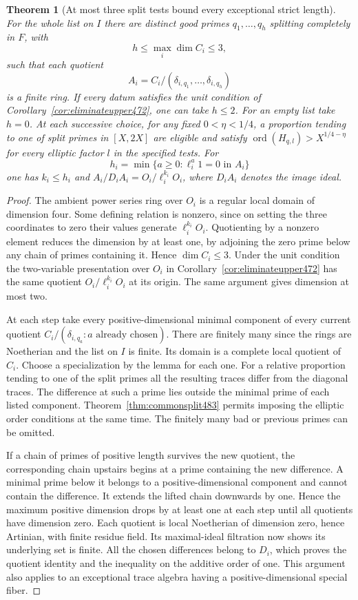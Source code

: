 \documentclass[a4paper,11pt]{article}
\newtheorem{theorem}[proposition]{Theorem}
\theoremstyle{definition}
\theoremstyle{remark}
\numberwithin{equation}{section}
\begin{document}
\begin{theorem}[At most three split tests bound every exceptional strict length]\leavevmode
\label{thm:artiniansplit490}
For the whole list on \(I\) there are distinct good primes
\(q_1,\ldots,q_h\) splitting completely in \(F\), with
\[
       h\le \max_i\dim C_i\le3 ,
\]
such that each quotient
\[
 A_i=C_i/(\delta_{i,q_1},\ldots,\delta_{i,q_h})
\]
is a finite ring. If every datum satisfies the unit condition of
Corollary~\ref{cor:eliminateupper472}, one can take \(h\le2\).
For an empty list take \(h=0\). At each successive choice, for
any fixed \(0<\eta<1/4\), a proportion tending to one of split
primes in \([X,2X]\) are eligible and satisfy
\(\operatorname{ord}(H_{q,l})>X^{1/4-\eta}\) for every elliptic
factor \(l\) in the specified tests. For
\[
 h_i=\min\{a\ge0:\ell_i^a1=0\text{ in }A_i\}
\]
one has \(k_i\le h_i\) and \(A_i/D_iA_i=O_i/\ell_i^{k_i}O_i\),
where \(D_iA_i\) denotes the image ideal.
\end{theorem}
\begin{proof}
The ambient power series ring over \(O_i\) is a regular local
domain of dimension four. Some defining relation is nonzero,
since on setting the three coordinates to zero their values
generate \(\ell_i^{k_i}O_i\). Quotienting by a nonzero element
reduces the dimension by at least one, by adjoining the zero
prime below any chain of primes containing it. Hence
\(\dim C_i\le3\). Under the unit condition the two-variable
presentation over \(O_i\) in Corollary~\ref{cor:eliminateupper472}
has the same quotient \(O_i/\ell_i^{k_i}O_i\) at its origin.
The same argument gives dimension at most two.

At each step take every positive-dimensional minimal component
of every current quotient \(C_i/(\delta_{i,q_a}:a\text{ already chosen})\).
There are finitely many since the rings are Noetherian and the
list on \(I\) is finite. Its domain is a complete local quotient
of \(C_i\). Choose a specialization by the lemma for each one.
For a relative proportion tending to one of the split primes
all the resulting traces differ from the diagonal traces.
The difference at such a prime lies outside the minimal prime
of each listed component. Theorem~\ref{thm:commonsplit483}
permits imposing the elliptic order conditions at the same time.
The finitely many bad or previous primes can be omitted.

If a chain of primes of positive length survives the new quotient,
the corresponding chain upstairs begins at a prime containing the
new difference. A minimal prime below it belongs to a
positive-dimensional component and cannot contain the difference.
It extends the lifted chain downwards by one. Hence the maximum
positive dimension drops by at least one at each step until
all quotients have dimension zero. Each quotient is local
Noetherian of dimension zero, hence Artinian, with finite residue
field. Its maximal-ideal filtration now shows its underlying set
is finite. All the chosen differences belong to \(D_i\), which
proves the quotient identity and the inequality on the additive
order of one. This argument also applies to an exceptional trace
algebra having a positive-dimensional special fiber.
\end{proof}
\end{document}
